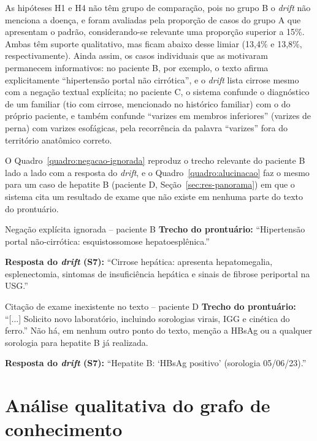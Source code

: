 As hipóteses H1 e H4 não têm grupo de comparação, pois no grupo B o \textit{drift} não menciona a doença, e foram avaliadas pela proporção de casos do grupo A que apresentam o padrão, considerando-se relevante uma proporção superior a 15\%. Ambas têm suporte qualitativo, mas ficam abaixo desse limiar (13,4\% e 13,8\%, respectivamente). Ainda assim, os casos individuais que as motivaram permanecem informativos: no paciente B, por exemplo, o texto afirma explicitamente ``hipertensão portal não cirrótica'', e o \textit{drift} lista cirrose mesmo com a negação textual explícita; no paciente C, o sistema confunde o diagnóstico de um familiar (tio com cirrose, mencionado no histórico familiar) com o do próprio paciente, e também confunde ``varizes em membros inferiores'' (varizes de perna) com varizes esofágicas, pela recorrência da palavra ``varizes'' fora do território anatômico correto.

O Quadro~\ref{quadro:negacao-ignorada} reproduz o trecho relevante do paciente B lado a lado com a resposta do \textit{drift}, e o Quadro~\ref{quadro:alucinacao} faz o mesmo para um caso de hepatite B (paciente D, Seção~\ref{sec:res-panorama}) em que o sistema cita um resultado de exame que não existe em nenhuma parte do texto do prontuário.

\begin{quadro}[label=quadro:negacao-ignorada]{Negação explícita ignorada -- paciente B}
\textbf{Trecho do prontuário:} ``Hipertensão portal não-cirrótica: esquistossomose hepatoesplênica.''

\textbf{Resposta do \textit{drift} (S7):} ``Cirrose hepática: apresenta hepatomegalia, esplenectomia, sintomas de insuficiência hepática e sinais de fibrose periportal na USG.''
\end{quadro}

\begin{quadro}[label=quadro:alucinacao]{Citação de exame inexistente no texto -- paciente D}
\textbf{Trecho do prontuário:} ``[...] Solicito novo laboratório, incluindo sorologias virais, IGG e cinética do ferro.'' Não há, em nenhum outro ponto do texto, menção a HBsAg ou a qualquer sorologia para hepatite B já realizada.

\textbf{Resposta do \textit{drift} (S7):} ``Hepatite B: `HBsAg positivo' (sorologia 05/06/23).''
\end{quadro}

\section{Análise qualitativa do grafo de conhecimento}\label{sec:res-grafos}

